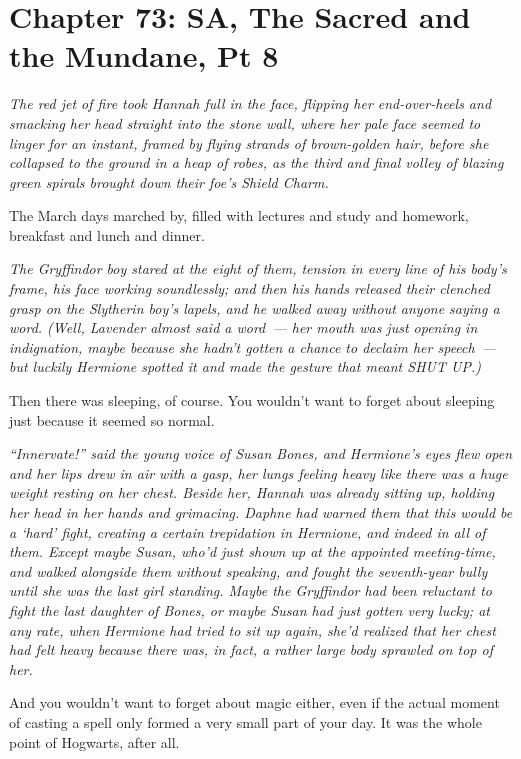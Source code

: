 \chapter{Chapter 73: SA, The Sacred and the Mundane, Pt 8}
\emph{The red jet of fire took Hannah full in the face, flipping her end-over-heels and smacking her head straight into the stone wall, where her pale face seemed to linger for an instant, framed by flying strands of brown-golden hair, before she collapsed to the ground in a heap of robes, as the third and final volley of blazing green spirals brought down their foe's Shield Charm.}

The March days marched by, filled with lectures and study and homework, breakfast and lunch and dinner.

\emph{The Gryffindor boy stared at the eight of them, tension in every line of his body's frame, his face working soundlessly; and then his hands released their clenched grasp on the Slytherin boy's lapels, and he walked away without anyone saying a word. (Well, Lavender almost said a word~--- her mouth was just opening in indignation, maybe because she hadn't gotten a chance to declaim her speech~--- but luckily Hermione spotted it and made the gesture that meant SHUT UP.)}

Then there was sleeping, of course. You wouldn't want to forget about sleeping just because it seemed so normal.

\emph{``Innervate!'' said the young voice of Susan Bones, and Hermione's eyes flew open and her lips drew in air with a gasp, her lungs feeling heavy like there was a huge weight resting on her chest. Beside her, Hannah was already sitting up, holding her head in her hands and grimacing. Daphne had warned them that this would be a `hard' fight, creating a certain trepidation in Hermione, and indeed in all of them. Except maybe Susan, who'd just shown up at the appointed meeting-time, and walked alongside them without speaking, and fought the seventh-year bully until she was the last girl standing. Maybe the Gryffindor had been reluctant to fight the last daughter of Bones, or maybe Susan had just gotten very lucky; at any rate, when Hermione had tried to sit up again, she'd realized that her chest had felt heavy because there was, in fact, a rather large body sprawled on top of her.}

And you wouldn't want to forget about magic either, even if the actual moment of casting a spell only formed a very small part of your day. It was the whole point of Hogwarts, after all.


